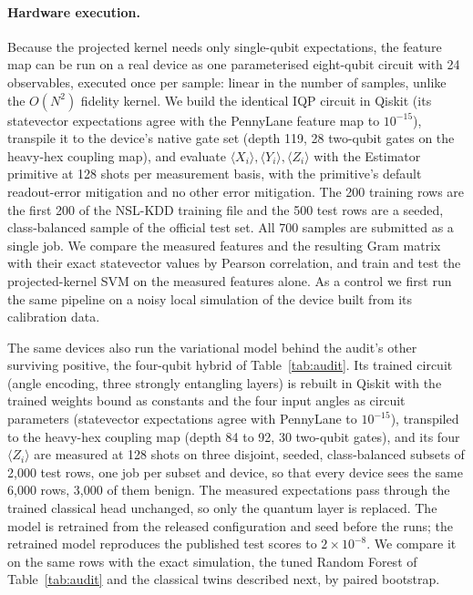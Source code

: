 \documentclass[preprint,11pt]{elsarticle}
\begin{document}
\paragraph{Hardware execution.} Because the projected kernel needs only single-qubit expectations, the
feature map can be run on a real device as one parameterised eight-qubit circuit with 24 observables,
executed once per sample: linear in the number of samples, unlike the $O(N^{2})$ fidelity kernel. We
build the identical IQP circuit in Qiskit (its statevector expectations agree with the PennyLane feature
map to $10^{-15}$), transpile it to the device's native gate set (depth 119, 28 two-qubit gates on the
heavy-hex coupling map), and evaluate $\langle X_i\rangle,\langle Y_i\rangle,\langle Z_i\rangle$ with the
Estimator primitive at 128 shots per measurement basis, with the primitive's default readout-error
mitigation and no other error mitigation. The 200 training rows are the first 200 of the NSL-KDD training
file and the 500 test rows are a seeded, class-balanced sample of the official test set. All 700 samples
are submitted as a single job. We compare the measured features and the resulting Gram matrix with their
exact statevector values by Pearson correlation, and train and test the projected-kernel SVM on the
measured features alone. As a control we first run the same pipeline on a noisy local simulation of the
device built from its calibration data.

The same devices also run the variational model behind the audit's other surviving positive, the
four-qubit hybrid of Table~\ref{tab:audit}. Its trained circuit (angle encoding, three strongly
entangling layers) is rebuilt in Qiskit with the trained weights bound as constants and the four input
angles as circuit parameters (statevector expectations agree with PennyLane to $10^{-15}$), transpiled to
the heavy-hex coupling map (depth 84 to 92, 30 two-qubit gates), and its four $\langle Z_i\rangle$ are
measured at 128 shots on three disjoint, seeded, class-balanced subsets of 2{,}000 test rows, one job per
subset and device, so that every device sees the same 6{,}000 rows, 3{,}000 of them benign. The measured
expectations pass through the trained classical head unchanged, so only the quantum layer is replaced.
The model is retrained from the released configuration and seed before the runs; the retrained model
reproduces the published test scores to $2\times10^{-8}$. We compare it on the same rows with the exact
simulation, the tuned Random Forest of Table~\ref{tab:audit} and the classical twins described next, by
paired bootstrap.
\end{document}
